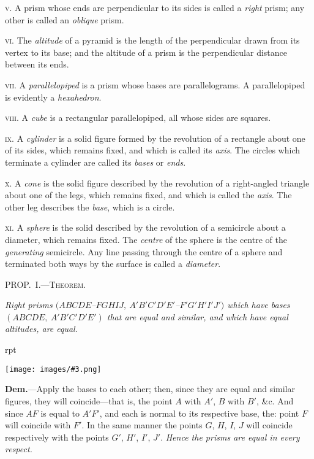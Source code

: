 \documentclass[oneside]{book}
\newcounter{wrapwidth}
\newcommand\mypropl[2]{
\bigskip\Needspace*{4\baselineskip}\begin{center}\textsc{#1}\end{center}
\hspace{\parindent}\emph{#2}\par\medskip
}
\newcommand\imgflow[3]{
\setcounter{wrapwidth}{#1}
\begin{wrapfigure}[#2]{r}{\value{wrapwidth}pt}
\begin{center}
\vspace{-0.3in}
\texttt{[image: images/\#3.png]}
\end{center}
\end{wrapfigure}
}
\begin{document}
\textsc{v.} A prism whose ends are perpendicular to its sides
is called a \textit{right} prism; any other is called an \textit{oblique}
prism.

\textsc{vi.} The \textit{altitude} of a pyramid is the length of the
perpendicular drawn from its vertex to its base; and
the altitude of a prism is the perpendicular distance
between its ends.

\textsc{vii.} A \textit{parallelopiped} is a prism whose bases are
parallelograms. A parallelopiped is evidently a \textit{hexahedron}.


\textsc{viii.} A \textit{cube} is a rectangular parallelopiped, all whose
sides are squares.

\textsc{ix.} A \textit{cylinder} is a solid figure formed by the revolution
of a rectangle about one of its sides, which remains
fixed, and which is called its \textit{axis}. The circles which
terminate a cylinder are called its \textit{bases} or \textit{ends}.

\textsc{x.} A \textit{cone} is the solid figure described by the revolution
of a right-angled triangle about one of the legs,
which remains fixed, and which is called the \textit{axis}. The
other leg describes the \textit{base}, which is a circle.

\textsc{xi.} A \textit{sphere} is the solid described by the revolution
of a semicircle about a diameter, which remains fixed.
The \textit{centre} of the sphere is the centre of the \textit{generating}
semicircle. Any line passing through the centre of
a sphere and terminated both ways by the surface is
called a \textit{diameter}.

\mypropl{PROP\@.~I.---Theorem.}{Right prisms $(ABCDE$--$FGHIJ,\ A'B'C'D'E'$--$F'G'H'I'J')$ which
have ba\-ses $(ABCDE,\ A'B'C'D'E')$ that are equal and similar,
and which have equal altitudes, are equal.}

\imgflow{175}{12}{f236}

\textbf{Dem.}---Apply the bases to each other; then, since
they are equal and
similar figures, they
will coincide---that
is, the point $A$ with
$A'$, $B$ with $B'$, \&c.
And since $AF$ is
equal to $A'F'$, and
each is normal to
its respective base,
the: point $F$ will
coincide with $F'$. In
the same manner the
points $G$, $H$, $I$, $J$ will coincide respectively with the
points $G'$, $H'$, $I'$, $J'$. \textit{Hence the prisms are equal in every
respect.}
\end{document}
